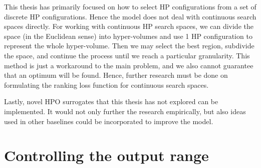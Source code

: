 \documentclass[12pt, twoside, ngerman]{report}
\begin{document}
This thesis has primarily focused on how to select HP configurations from a set of discrete HP configurations.
Hence the model does not deal with continuous search spaces directly.
For working with continuous HP search spaces,  we can divide the space  (in the Euclidean sense) into hyper-volumes and use 1 HP configuration to represent the whole hyper-volume.
Then we may select the best region, subdivide the space, and continue the process until we reach a particular granularity.
This method is just a workaround to the main problem, and we also cannot guarantee that an optimum will be found.
Hence, further research must be done on formulating the ranking loss function for continuous search spaces.

Lastly, novel HPO surrogates that this thesis has not explored can be implemented. It would not only further the research empirically, but also ideas used in other baselines could be incorporated to improve the model.

\appendix
\newpage
{}
\chapter{Controlling the output range}
\label{chap:OutputRangeControl}
\end{document}
